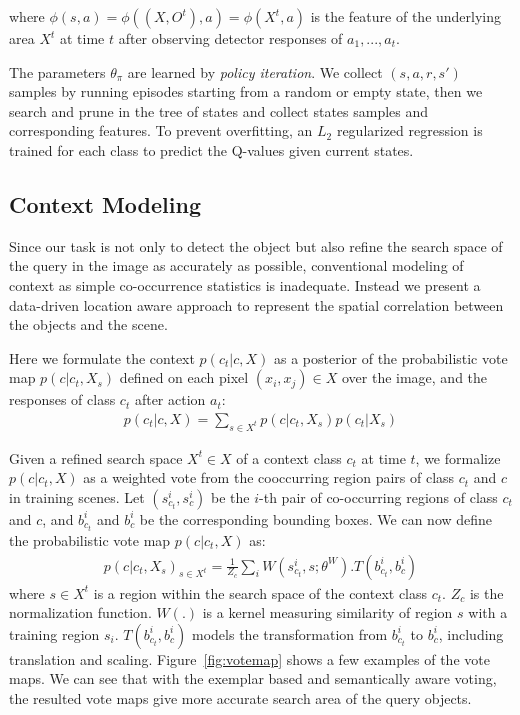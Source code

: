 where $\phi(s,a) = \phi((X, O^t),a) = \phi(X^t,a)$ is the feature of the underlying area $X^t$ at time $t$ after observing detector responses of $a_1,...,a_t$. 

The parameters $\theta_\pi$ are learned by \textit{policy iteration}. We collect $(s,a,r,s')$ samples by running episodes starting from a random or empty state, then we search and prune in the tree of states and collect states samples  and corresponding features. To prevent overfitting, an $L_2$ regularized regression is trained for each class to predict the Q-values given current states.

\subsection{Context Modeling}
\label{sec:context}
Since our task is not only to detect the object but also refine the search space of the query in the image as accurately as possible, conventional modeling of context as simple co-occurrence statistics is inadequate. Instead we present a data-driven location aware approach to represent the spatial correlation between the objects and the scene. 

Here we formulate the context $p(c_t|c,X)$ as a posterior of the probabilistic vote map $p(c|c_t,X_s)$ defined on each pixel $(x_i,x_j)\in X$ over the image, and the responses of class $c_t$ after action $a_t$:
\begin{eqnarray}
p(c_t|c,X) = \sum_{s\in X^t} p(c|c_t,X_s)p(c_t|X_s)
\end{eqnarray}

Given a refined search space $X^t\in X$ of a context class $c_t$ at time $t$, we formalize $p(c|c_t,X)$ as a weighted vote from the cooccurring region pairs of class $c_t$ and $c$ in training scenes. Let $(s_{c_t}^i, s_c^i)$ be the $i$-th pair of co-occurring regions of class $c_t$ and $c$, and $b_{c_t}^i$ and $b_c^i$ be the corresponding bounding boxes. We can now define the probabilistic vote map $p(c|c_t,X)$ as:
\begin{eqnarray}
\label{eq:votemap}
p(c|c_t,X_s)_{s\in X^t} = \frac{1}{Z_c}\sum_i W(s_{c_t}^i,s;\theta^W).T(b_{c_t}^i,b_c^i)
\end{eqnarray}
where $s\in X^t$ is a region within the search space of the context class $c_t$. $Z_c$ is the normalization function. $W(.)$ is a kernel measuring similarity of region $s$ with a training region $s_i$. $T(b_{c_t}^i,b_c^i)$ models the transformation from $b_{c_t}^i$ to $b_c^i$, including translation and scaling. Figure~\ref{fig:votemap} shows a few examples of the vote maps. We can see that with the exemplar based and semantically aware voting, the resulted vote maps give more accurate search area of the query objects.


